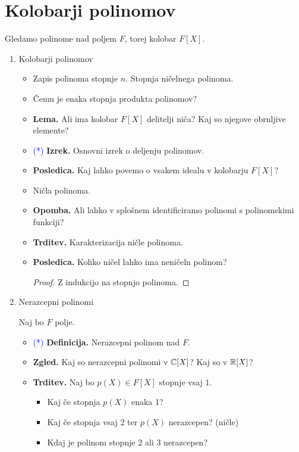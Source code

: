 \section{Kolobarji polinomov}

Gledamo polinome nad poljem \(F\), torej kolobar \(F[X]\).
\begin{enumerate}
    \item Kolobarji polinomov
    \begin{itemize}
        \item Zapis polinoma stopnje \(n\). Stopnja ničelnega polinoma.
        \item Čemu je enaka stopnja produkta polinomov?
        \item \textbf{Lema.} Ali ima kolobar \(F[X]\) delitelji niča? Kaj so njegove obrnljive elemente?
        \item \textcolor{blue}{(*)} \textbf{Izrek.} Osnovni izrek o deljenju polinomov.
        \item \textbf{Posledica.} Kaj lahko povemo o vsakem idealu v kolobarju \(F[X]\)?
        \item Ničla polinoma.
        \item \textbf{Opomba.} Ali lahko v splošnem identificiramo polinomi s polinomskimi funkciji?
        \item \textbf{Trditev.} Karakterizacija ničle polinoma.
        \item \textbf{Posledica.} Koliko ničel lahko ima neničeln polinom?
        \begin{proof}
            Z indukcijo na stopnjo polinoma.
        \end{proof}
    \end{itemize}

    \item Nerazcepni polinomi
    
    Naj bo \(F\) polje.
    \begin{itemize}
        \item \textcolor{blue}{(*)} \textbf{Definicija.} Nerazcepni polinom nad \(F\).
        \item \textbf{Zgled.} Kaj so nerazcepni polinomi v \(\mathbb{C}[X]\)? Kaj so v \(\mathbb{R}[X]\)?
        \item \textbf{Trditev.} Naj bo \(p(X) \in F[X]\) stopnje vsaj \(1\).
        \begin{itemize}
            \item Kaj če stopnja \(p(X)\) enaka 1?
            \item Kaj če stopnja vsaj 2 ter \(p(X)\) nerazcepen? (ničle)
            \item Kdaj je polinom stopnje 2 ali 3 nerazcepen?
        \end{itemize}
    \end{itemize}


\end{enumerate}
